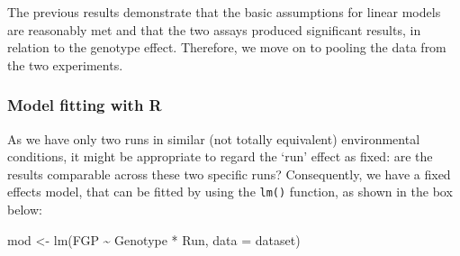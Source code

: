 \documentclass[a4paper,12pt,oneside]{book}
\newenvironment{Shaded}{\begin{snugshade}}{\end{snugshade}}
\newcommand{\SpecialCharTok}[1]{#1}
\newcommand{\DocumentationTok}[1]{#1}
\newcommand{\OtherTok}[1]{#1}
\newcommand{\FunctionTok}[1]{#1}
\newcommand{\AttributeTok}[1]{#1}
\newcommand{\NormalTok}[1]{#1}
\begin{document}
\begin{Shaded}
\end{Shaded}

The previous results demonstrate that the basic assumptions for linear models are reasonably met and that the two assays produced significant results, in relation to the genotype effect. Therefore, we move on to pooling the data from the two experiments.

\hypertarget{model-fitting-with-r-5}{%
\subsubsection{Model fitting with R}\label{model-fitting-with-r-5}}

As we have only two runs in similar (not totally equivalent) environmental conditions, it might be appropriate to regard the `run' effect as fixed: are the results comparable across these two specific runs? Consequently, we have a fixed effects model, that can be fitted by using the \texttt{lm()} function, as shown in the box below:

\begin{Shaded}
\begin{Highlighting}[]
\NormalTok{mod }\OtherTok{\textless{}{-}} \FunctionTok{lm}\NormalTok{(FGP }\SpecialCharTok{\textasciitilde{}}\NormalTok{ Genotype }\SpecialCharTok{*}\NormalTok{ Run, }\AttributeTok{data =}\NormalTok{ dataset)}
\end{Highlighting}
\end{Shaded}
\end{document}
